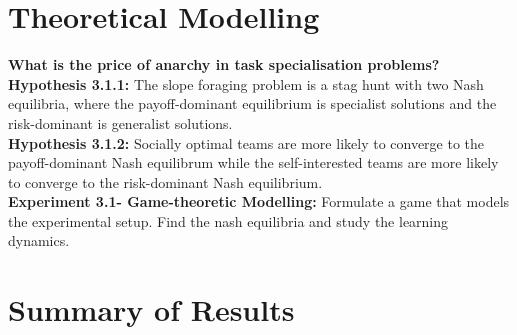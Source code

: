 \documentclass[12pt]{article}
\begin{document}
\section{Theoretical Modelling}

\textbf{What is the price of anarchy in task specialisation problems?}\\

\textbf{Hypothesis 3.1.1:} The slope foraging problem is a stag hunt with two Nash equilibria, where the payoff-dominant equilibrium is specialist solutions and the risk-dominant is generalist solutions.\\

\textbf{Hypothesis 3.1.2:} Socially optimal teams are more likely to converge to the payoff-dominant Nash equilibrum while the self-interested teams are more likely to converge to the risk-dominant Nash equilibrium.\\

\textbf{Experiment 3.1- Game-theoretic Modelling:} Formulate a game that models the experimental setup. 
Find the nash equilibria and study the learning dynamics.\\




\appendix

\section{Summary of Results}
\end{document}
